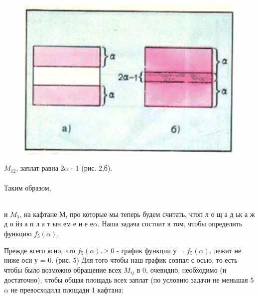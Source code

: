 \begin{multicols}{2}
\newpage
  

\begin{figure}  
\centering
        \includegraphics[width=.95\columnwidth]{latex.png}
\end{figure}

$M_{12}$, заплат равна 2$\alpha $ - 1 (рис. 2,б).
\\
\\Таким образом,   

\\и $M_{5}$, на кафтане М, про которые мы теперь будем считать, что\quad \qquad п л о щ а д ь\quad  к а ж д о й\quad  з а п л а т ы\quad  н е\quad м е н е е\quad $\alpha$. Наша задача состоит в том, чтобы определить функцию $f_5(\alpha)$.

Прежде всего ясно, что $f_5(\alpha)$. ≥  0 - график функции у = $f_5(\alpha)$.
лежит не ниже оси у = 0. (рис. 5)
Для того чтобы наш график совпал с осью, то есть чтобы было возможно обращение всех $M_{ij}$ в 0, очевидно, необходимо (и достаточно), чтобы общая площадь всех заплат (по условию задачи не меньшая 5$\alpha$ не превосходила площади 1 кафтана:

\end{multicols}


